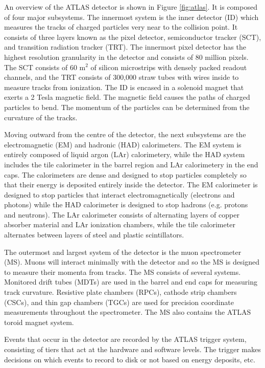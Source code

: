 An overview of the ATLAS detector is shown in Figure \ref{fig:atlas}. It is composed of four major subsystems. The innermost system is the inner detector (ID) which measures the tracks of charged particles very near to the collision point. It consists of three layers known as the pixel detector, semiconductor tracker (SCT), and transition radiation tracker (TRT). The innermost pixel detector has the highest resolution granularity in the detector and consists of 80 million pixels. The SCT consists of 60 m$^2$ of silicon microstrips with densely packed readout channels, and the TRT consists of 300,000 straw tubes with wires inside to measure tracks from ionization. The ID is encased in a solenoid magnet that exerts a 2 Tesla magnetic field. The magnetic field causes the paths of charged particles to bend. The momentum of the particles can be determined from the curvature of the tracks.

Moving outward from the centre of the detector, the next subsystems are the electromagnetic (EM) and hadronic (HAD) calorimeters. The EM system is entirely composed of liquid argon (LAr) calorimetery, while the HAD system includes the tile calorimeter in the barrel region and LAr calorimetery in the end caps. The calorimeters are dense and designed to stop particles completely so that their energy is deposited entirely inside the detector. The EM calorimeter is designed to stop particles that interact electromagnetically (electrons and photons) while the HAD calorimeter is designed to stop hadrons (e.g. protons and neutrons). The LAr calorimeter consists of alternating layers of copper absorber material and LAr ionization chambers, while the tile calorimeter alternates between layers of steel and plastic scintillators. 

The outermost and largest system of the detector is the muon spectrometer (MS). Muons will interact minimally with the detector and so the MS is designed to measure their momenta from tracks. The MS consists of several systems. Monitored drift tubes (MDTs) are used in the barrel and end caps for measuring track curvature. Resistive plate chambers (RPCs), cathode strip chambers (CSCs), and thin gap chambers (TGCs) are used for precision coordinate measurements throughout the spectrometer. The MS also contains the ATLAS toroid magnet system.

Events that occur in the detector are recorded by the ATLAS trigger system, consisting of tiers that act at the hardware and software levels. The trigger makes decisions on which events to record to disk or not based on energy deposits, etc.

\clearpage


